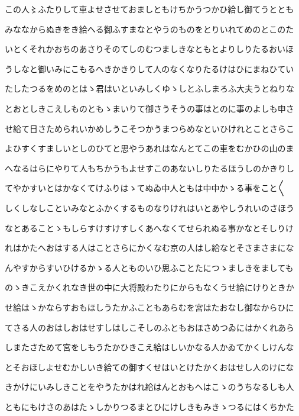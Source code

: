 \documentclass[a4paper,11pt,landscape]{ltjtarticle}
\begin{document}
\par\medskip
この人〻ふたりして車よせさせておましともけちかうつかひ給し御てうととも
\par\medskip
みななからぬきをき給へる御ふすまなとやうのものをとりいれてめのとこのた
\par\medskip
いとくそれかおちのあさりそのてしのむつましきなともとよりしりたるおいほ
\par\medskip
うしなと御いみにこもるへきかきりして人のなくなりたるけはひにまねひてい
\par\medskip
たしたつるをめのとはゝ君はいといみしくゆゝしとふしまろふ大夫うとねりな
\par\medskip
とおとしきこえしものともゝまいりて御さうそうの事はとのに事のよしも申さ
\par\medskip
せ給て日さためられいかめしうこそつかうまつらめなといひけれとことさらこ
\par\medskip
よひすくすましいとしのひてと思やうあれはなんとてこの車をむかひの山のま
\par\medskip
へなるはらにやりて人もちかうもよせすこのあないしりたるほうしのかきりし
\par\medskip
てやかすいとはかなくてけふりはゝてぬゐ中人ともは中中かゝる事をこと〱
\par\medskip
しくしなしこといみなとふかくするものなりけれはいとあやしうれいのさほう
\par\medskip
なとあることゝもしらすけすけすしくあへなくてせられぬる事かなとそしりけ
\par\medskip
れはかたへおはする人はことさらにかくなむ京の人はし給なとそさまさまにな
\par\medskip
んやすからすいひけるかゝる人とものいひ思ふことたにつゝましきをましても
\par\medskip
のゝきこえかくれなき世の中に大将殿わたりにからもなくうせ給にけりときか
\par\medskip
せ給はゝかならすおもほしうたかふこともあらむを宮はたおなし御なからひに
\par\medskip
てさる人のおはしおはせすしはしこそしのふともおほさめつゐにはかくれあら
\par\medskip
しまたさためて宮をしもうたかひきこえ給はしいかなる人かゐてかくしけんな
\par\medskip
とそおほしよせむかしいき給ての御すくせはいとけたかくおはせし人のけにな
\par\medskip
きかけにいみしきことをやうたかはれ給はんとおもへはこゝのうちなるしも人
\par\medskip
ともにもけさのあはたゝしかりつるまとひにけしきもみきゝつるにはくちかた
\end{document}
